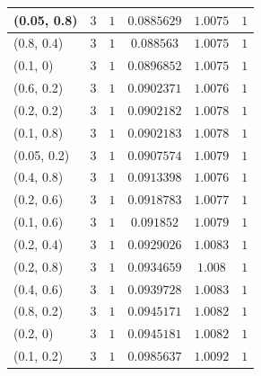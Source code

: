 \begin{center}
{\begin{longtable}{| l | c | c | c | c | c |}
(0.05, 0.8) & $3$ & $1$ & $0.0885629$ & $1.0075$ & $1$ \\ \hline
(0.8, 0.4) & $3$ & $1$ & $0.088563$ & $1.0075$ & $1$ \\ \hline
(0.1, 0) & $3$ & $1$ & $0.0896852$ & $1.0075$ & $1$ \\ \hline
(0.6, 0.2) & $3$ & $1$ & $0.0902371$ & $1.0076$ & $1$ \\ \hline
(0.2, 0.2) & $3$ & $1$ & $0.0902182$ & $1.0078$ & $1$ \\ \hline
(0.1, 0.8) & $3$ & $1$ & $0.0902183$ & $1.0078$ & $1$ \\ \hline
(0.05, 0.2) & $3$ & $1$ & $0.0907574$ & $1.0079$ & $1$ \\ \hline
(0.4, 0.8) & $3$ & $1$ & $0.0913398$ & $1.0076$ & $1$ \\ \hline
(0.2, 0.6) & $3$ & $1$ & $0.0918783$ & $1.0077$ & $1$ \\ \hline
(0.1, 0.6) & $3$ & $1$ & $0.091852$ & $1.0079$ & $1$ \\ \hline
(0.2, 0.4) & $3$ & $1$ & $0.0929026$ & $1.0083$ & $1$ \\ \hline
(0.2, 0.8) & $3$ & $1$ & $0.0934659$ & $1.008$ & $1$ \\ \hline
(0.4, 0.6) & $3$ & $1$ & $0.0939728$ & $1.0083$ & $1$ \\ \hline
(0.8, 0.2) & $3$ & $1$ & $0.0945171$ & $1.0082$ & $1$ \\ \hline
(0.2, 0) & $3$ & $1$ & $0.0945181$ & $1.0082$ & $1$ \\ \hline
(0.1, 0.2) & $3$ & $1$ & $0.0985637$ & $1.0092$ & $1$ \\ \hline
\end{longtable}

}
\end{center}
